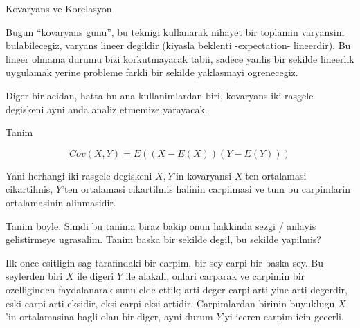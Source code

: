 \documentclass[12pt,fleqn]{article}\usepackage{../common}
\begin{document}
Kovaryans ve Korelasyon

Bugun ``kovaryans gunu'', bu teknigi kullanarak nihayet bir toplamin
varyansini bulabilecegiz, varyans lineer degildir (kiyasla beklenti
-expectation- lineerdir). Bu lineer olmama durumu bizi korkutmayacak tabii,
sadece yanlis bir sekilde lineerlik uygulamak yerine probleme farkli bir
sekilde yaklasmayi ogrenecegiz. 

Diger bir acidan, hatta bu ana kullanimlardan biri, kovaryans iki rasgele
degiskeni ayni anda analiz etmemize yarayacak. 

Tanim

$$ Cov(X,Y) = E((X-E(X))(Y-E(Y)))  $$

Yani herhangi iki rasgele degiskeni $X,Y$'in kovaryansi $X$'ten
ortalamasi cikartilmis, $Y$'ten ortalamasi cikartilmis halinin carpilmasi
ve tum bu carpimlarin ortalamasinin alinmasidir. 

Tanim boyle. Simdi bu tanima biraz bakip onun hakkinda sezgi / anlayis
gelistirmeye ugrasalim. Tanim baska bir sekilde degil, bu sekilde yapilmis? 

Ilk once esitligin sag tarafindaki bir carpim, bir sey carpi bir baska
sey. Bu seylerden biri $X$ ile digeri $Y$ ile alakali, onlari carparak ve
carpimin bir ozelliginden faydalanarak sunu elde ettik; arti deger carpi
arti yine arti degerdir, eski carpi arti eksidir, eksi carpi eksi
artidir. Carpimlardan birinin buyuklugu $X$'in ortalamasina bagli olan bir
diger, ayni durum $Y$'yi iceren carpim icin gecerli. 
\end{document}
